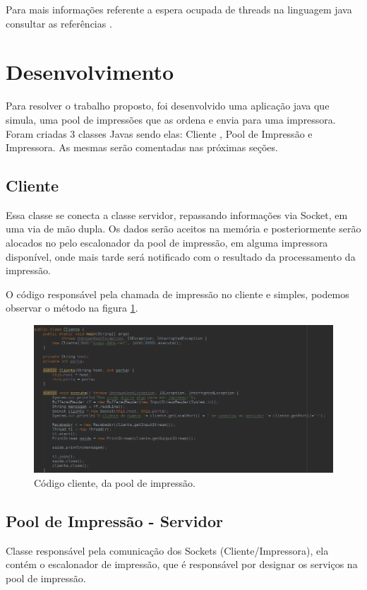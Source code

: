 \documentclass[12pt]{article}
\begin{document}
 Para mais informações referente a espera ocupada de threads na linguagem java consultar as referências \cite{conc} \cite{wait}.
\section{Desenvolvimento}
Para resolver o trabalho proposto, foi desenvolvido uma aplicação java que simula, uma pool de impressões que as ordena e envia para uma impressora.
Foram criadas 3 classes Javas sendo elas: Cliente , Pool de Impressão e Impressora.
As mesmas serão comentadas nas próximas seções.
\subsection{Cliente}
	Essa classe  se conecta a classe servidor, repassando informações via Socket, em uma via de mão dupla.
Os dados serão aceitos na memória e posteriormente serão alocados no pelo escalonador da pool de impressão, em alguma impressora disponível, onde mais tarde será notificado com o resultado da processamento da impressão.

O código responsável pela chamada de impressão no cliente e simples, podemos observar o método na figura  \ref{fig:screenshot005}.

\begin{figure}[H]
	\centering
	\includegraphics[width=1\linewidth]{imagens/screenshot005}
	\caption{Código cliente, da pool de impressão.}
	\label{fig:screenshot005}
\end{figure}



\subsection{Pool de Impressão - Servidor}\label{pool}
  Classe responsável pela comunicação dos Sockets (Cliente/Impressora), ela contém o escalonador  de impressão, que  é responsável por designar os serviços na pool de impressão.
  
\end{document}
